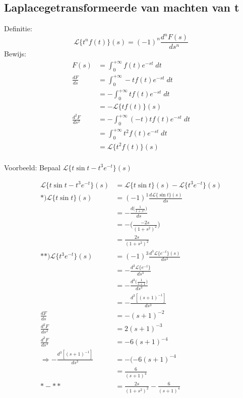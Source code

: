 \documentclass[12pt]{report}
\newcommand{\example}[2]{
    \hrulefill
    
    Voorbeeld: #1
    
    #2
    
    \hrulefill
}
\begin{document}
\subsection{Laplacegetransformeerde van machten van t}
Definitie:
$$\mathcal{L}\{t^nf(t)\}(s) = (-1)^n\frac{d^nF(s)}{ds^n}$$
Bewijs:
\begin{equation*}
 \begin{split}
  F(s) & = \int_0^{+\infty}f(t)e^{-st}\; dt \\
  \frac{dF}{ds} & = \int_0^{+\infty}-tf(t)e^{-st}\; dt  \\
                & = -\int_0^{+\infty}tf(t)e^{-st}\; dt  \\
                & = -\mathcal{L}\{tf(t)\}(s)  \\
  \frac{d^2F}{ds^2} & = -\int_0^{+\infty}(-t)tf(t)e^{-st}\; dt  \\
                    & = \int_0^{+\infty}t^2f(t)e^{-st}\; dt  \\
                    & = \mathcal{L}\{t^2f(t)\}(s)  \\
 \end{split}
\end{equation*}
\example{Bepaal $\mathcal{L}\{t \sin t - t^3e^{-t}\}(s)$}{
\begin{equation*}
 \begin{split}
  \mathcal{L}\{t \sin t - t^3e^{-t}\}(s) & = \mathcal{L}\{t \sin t\}(s) - \mathcal{L}\{t^3e^{-t}\}(s)\\
  *) \mathcal{L}\{t \sin t\}(s) & = (-1)^1\frac{d\mathcal{L}\{\sin t\}(s)}{ds} \\
                                & =  -\frac{d\big(\frac{1}{1 + s^2}\big)}{ds} \\
                                & = -\bigg(\frac{-2s}{(1+s^2)^2}\bigg) \\
                                & = \frac{2s}{(1+s^2)^2} \\
**) \mathcal{L}\{t^3e^{-t}\}(s) & = (-1)^3\frac{d^3\mathcal{L}\{e^{-t}\}(s)}{ds^3} \\
                                & = -\frac{d^3\mathcal{L}\{e^{-t}\}}{ds^3} \\
                                & = -\frac{d^3\big(\frac{1}{s + 1}\big)}{ds^3} \\
                                & = -\frac{d^3[(s + 1)^{-1}]}{ds^3} \\
                            \frac{dF}{ds} & = -(s+1)^{-2} \\
                            \frac{d^2F}{ds^2} & = 2(s+1)^{-3} \\
                            \frac{d^3F}{ds^3} & = -6(s+1)^{-4} \\
                            \Rightarrow -\frac{d^3[(s + 1)^{-1}]}{ds^3} & = -(-6(s+1)^{-4} \\
                            & = \frac{6}{(s+1)^4}\\
 * - ** & = \frac{2s}{(1+s^2)^2} - \frac{6}{(s+1)^4}
 \end{split}
\end{equation*}}
\end{document}
